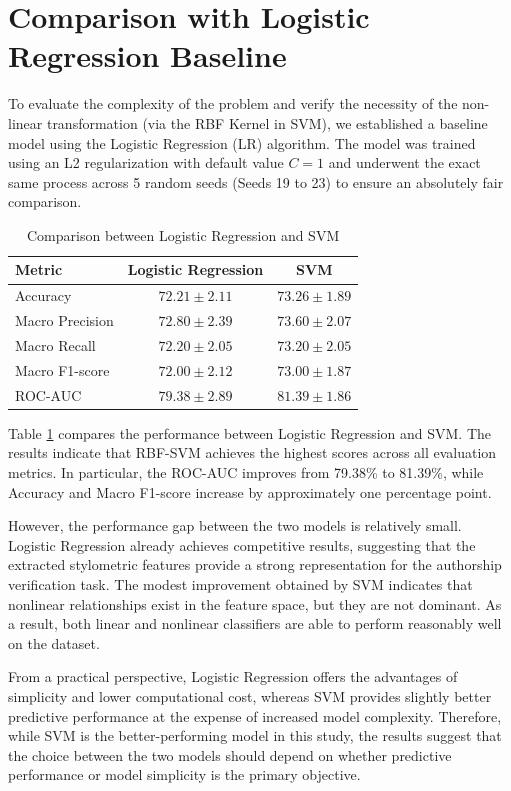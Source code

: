 \documentclass[11pt]{article}
\begin{document}
\section{Comparison with Logistic Regression Baseline}

To evaluate the complexity of the problem and verify the necessity of the non-linear transformation (via the RBF Kernel in SVM), we established a baseline model using the Logistic Regression (LR) algorithm. The model was trained using an L2 regularization with default value $C=1$ and underwent the exact same process across 5 random seeds (Seeds 19 to 23) to ensure an absolutely fair comparison.

\begin{table}[h]
\centering
\begin{tabular}{lcc}
\hline
Metric & Logistic Regression & SVM \\
\hline
Accuracy & $72.21 \pm 2.11$ & $73.26 \pm 1.89$ \\
Macro Precision & $72.80 \pm 2.39$ & $73.60 \pm 2.07$ \\
Macro Recall & $72.20 \pm 2.05$ & $73.20 \pm 2.05$ \\
Macro F1-score & $72.00 \pm 2.12$ & $73.00 \pm 1.87$ \\
ROC-AUC & $79.38 \pm 2.89$ & $81.39 \pm 1.86$ \\
\hline
\end{tabular}
\caption{Comparison between Logistic Regression and SVM}
\label{tab:comparison_lr_svm}
\end{table}

Table \ref{tab:comparison_lr_svm} compares the performance between Logistic Regression and SVM. The results indicate that RBF-SVM achieves the highest scores across all evaluation metrics. In particular, the ROC-AUC improves from 79.38\% to 81.39\%, while Accuracy and Macro F1-score increase by approximately one percentage point.

However, the performance gap between the two models is relatively small. Logistic Regression already achieves competitive results, suggesting that the extracted stylometric features provide a strong representation for the authorship verification task. The modest improvement obtained by SVM indicates that nonlinear relationships exist in the feature space, but they are not dominant. As a result, both linear and nonlinear classifiers are able to perform reasonably well on the dataset.

From a practical perspective, Logistic Regression offers the advantages of simplicity and lower computational cost, whereas SVM provides slightly better predictive performance at the expense of increased model complexity. Therefore, while SVM is the better-performing model in this study, the results suggest that the choice between the two models should depend on whether predictive performance or model simplicity is the primary objective.
\end{document}
